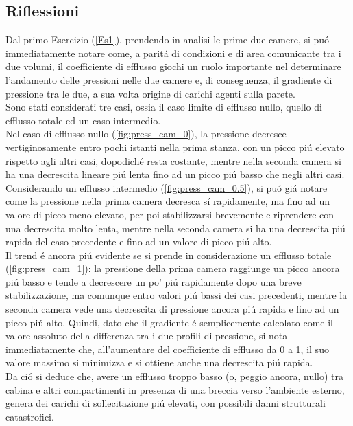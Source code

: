 \documentclass{article}
\begin{document}
        \clearpage

        \subsection{Riflessioni}
        Dal primo Esercizio (\ref{Es1}), prendendo in analisi le prime due camere, si puó immediatamente notare come,
        a paritá di condizioni e di area comunicante tra i due volumi,
        il coefficiente di efflusso giochi un ruolo importante nel determinare l'andamento
        delle pressioni nelle due camere e, di conseguenza, il gradiente di pressione tra le due,
        a sua volta origine di carichi agenti sulla parete.\\ 
        Sono stati considerati tre casi, ossia il caso limite di efflusso nullo, quello di efflusso totale
        ed un caso intermedio.\\ 
        Nel caso di efflusso nullo (\ref{fig:press_cam_0}), la pressione decresce
        vertiginosamente entro pochi istanti nella prima stanza, con un picco piú elevato 
        rispetto agli altri casi, dopodiché resta costante, mentre nella seconda camera
        si ha una decrescita lineare piú lenta fino ad un picco piú basso che negli altri casi.\\ 
        Considerando un efflusso intermedio (\ref{fig:press_cam_0.5}), si puó giá 
        notare come la pressione nella prima camera decresca sí rapidamente, ma 
        fino ad un valore di picco meno elevato, per poi stabilizzarsi brevemente e riprendere con una decrescita molto lenta, 
        mentre nella seconda camera si ha una decrescita piú rapida del caso precedente e fino ad un valore di picco piú alto.
        \\ 
        Il trend é ancora piú evidente se si prende in considerazione un efflusso 
        totale (\ref{fig:press_cam_1}): la pressione della prima camera
        raggiunge un picco ancora piú basso e tende a decrescere un po' piú rapidamente
        dopo una breve stabilizzazione, ma comunque entro valori piú bassi dei casi precedenti, mentre 
        la seconda camera vede una decrescita di pressione ancora piú rapida
        e fino ad un picco piú alto.\linebreak
        \linebreak
        Quindi, dato che il gradiente é semplicemente calcolato come il valore assoluto
        della differenza tra i due profili di pressione, si nota immediatamente che, 
        all'aumentare del coefficiente di efflusso da 0 a 1, il suo valore
        massimo si minimizza e si ottiene anche una decrescita piú rapida.\\ 
        Da ció si deduce che, avere un efflusso troppo basso (o, peggio ancora, nullo)
        tra cabina e altri compartimenti in presenza di una breccia verso l'ambiente esterno, genera dei carichi di sollecitazione
        piú elevati, con possibili danni strutturali catastrofici.
\end{document}
